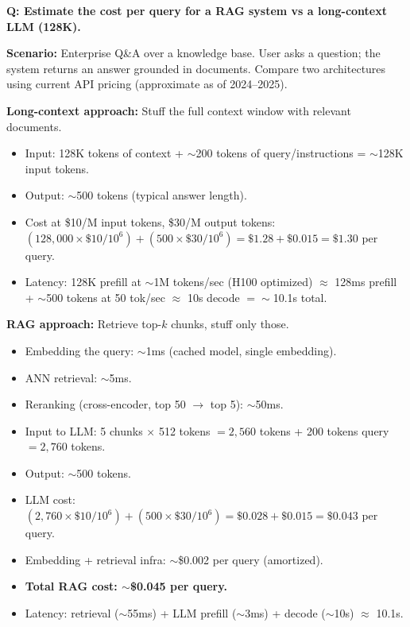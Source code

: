 \begin{interviewq}
\textbf{Q: Estimate the cost per query for a RAG system vs a long-context LLM (128K).}

 \quad {} \quad \badgefreq{\freqhigh}

\stronganswer

\textbf{Scenario:} Enterprise Q\&A over a knowledge base. User asks a question; the system returns an answer grounded in documents. Compare two architectures using current API pricing (approximate as of 2024--2025).

\textbf{Long-context approach:} Stuff the full context window with relevant documents.
\begin{itemize}
    \item Input: 128K tokens of context + $\sim$200 tokens of query/instructions = $\sim$128K input tokens.
    \item Output: $\sim$500 tokens (typical answer length).
    \item Cost at \$10/M input tokens, \$30/M output tokens: $(128{,}000 \times \$10 / 10^6) + (500 \times \$30 / 10^6) = \$1.28 + \$0.015 = \$1.30$ per query.
    \item Latency: 128K prefill at $\sim$1M tokens/sec (H100 optimized) $\approx$ 128ms prefill + $\sim$500 tokens at 50 tok/sec $\approx$ 10s decode $= \sim$10.1s total.
\end{itemize}

\textbf{RAG approach:} Retrieve top-$k$ chunks, stuff only those.
\begin{itemize}
    \item Embedding the query: $\sim$1ms (cached model, single embedding).
    \item ANN retrieval: $\sim$5ms.
    \item Reranking (cross-encoder, top 50 $\rightarrow$ top 5): $\sim$50ms.
    \item Input to LLM: 5 chunks $\times$ 512 tokens $= 2{,}560$ tokens + 200 tokens query $= 2{,}760$ tokens.
    \item Output: $\sim$500 tokens.
    \item LLM cost: $(2{,}760 \times \$10/10^6) + (500 \times \$30/10^6) = \$0.028 + \$0.015 = \$0.043$ per query.
    \item Embedding + retrieval infra: $\sim$\$0.002 per query (amortized).
    \item \textbf{Total RAG cost: $\sim$\$0.045 per query.}
    \item Latency: retrieval ($\sim$55ms) + LLM prefill ($\sim$3ms) + decode ($\sim$10s) $\approx$ 10.1s.
\end{itemize}


\end{interviewq}
